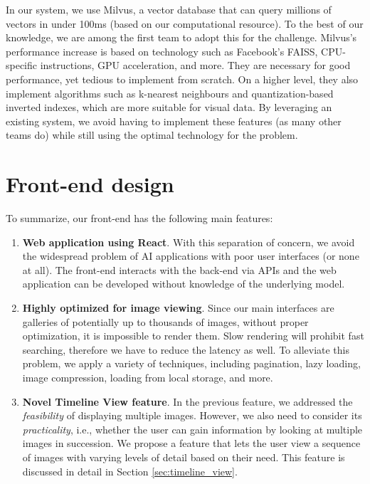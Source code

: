 \begin{itemize}
\vspace{-2mm}    
    In our system, we use Milvus, a vector database that can query millions of vectors in under 100ms (based on our computational resource). To the best of our knowledge, we are among the first team to adopt this for the challenge. Milvus's performance increase is based on technology such as Facebook's FAISS, CPU-specific instructions, GPU acceleration, and more. They are necessary for good performance, yet tedious to implement from scratch. On a higher level, they also implement algorithms such as k-nearest neighbours and quantization-based inverted indexes, which are more suitable for visual data. By leveraging an existing system, we avoid having to implement these features (as many other teams do) while still using the optimal technology for the problem.
\end{itemize}

\section{Front-end design}
\label{sec:first_front_end_design}

\vspace{-2mm}
To summarize, our front-end has the following main features:

\begin{enumerate}
\vspace{-2mm}
    \item \textbf{Web application using React}. With this separation of concern, we avoid the widespread problem of AI applications with poor user interfaces (or none at all). The front-end interacts with the back-end via APIs and the web application can be developed without knowledge of the underlying model.
\vspace{-2mm}    
    \item \textbf{Highly optimized for image viewing}. Since our main interfaces are galleries of potentially up to thousands of images, without proper optimization, it is impossible to render them. Slow rendering will prohibit fast searching, therefore we have to reduce the latency as well. To alleviate this problem, we apply a variety of techniques, including pagination, lazy loading, image compression, loading from local storage, and more.
\vspace{-2mm}    
    \item \textbf{Novel Timeline View feature}. In the previous feature, we addressed the \textit{feasibility} of displaying multiple images. However, we also need to consider its \textit{practicality}, i.e., whether the user can gain information by looking at multiple images in succession. We propose a feature that lets the user view a sequence of images with varying levels of detail based on their need. This feature is discussed in detail in Section \ref{sec:timeline_view}.
\end{enumerate}

